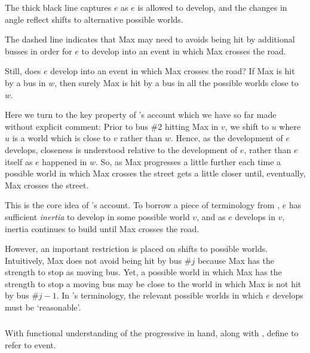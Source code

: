 \begin{note}
  The thick black line captures \(e\) as \(e\) is allowed to develop, and the changes in angle reflect shifts to alternative possible worlds.

  The dashed line indicates that Max may need to avoids being hit by additional busses in order for \(e\) to develop into an event in which Max crosses the road.

  Still, does \(e\) develop into an event in which Max crosses the road?
  If Max is hit by a bus in \(w\), then surely Max is hit by a bus in all the possible worlds close to \(w\).

  Here we turn to the key property of \citeauthor{Landman:1992wh}'s account which we have so far made without explicit comment:
  Prior to bus \#2 hitting Max in \(v\), we shift to \(u\) where \(u\) is a world which is close to \(v\) rather than \(w\).
  Hence, as the development of \(e\) develops, closeness is understood relative to the development of \(e\), rather than \(e\) itself as \(e\) happened in \(w\).
  So, as Max progresses a little further each time a possible world in which Max crosses the street gets a little closer until, eventually, Max crosses the street.

  This is the core idea of \citeauthor{Landman:1992wh}'s account.
  To borrow a piece of terminology from \textcite{Dowty:1979vq}, \(e\) has sufficient \emph{inertia} to develop in some possible world \(v\), and as \(e\) develops in \(v\), inertia continues to build until Max crosses the road.

  However, an important restriction is placed on shifts to possible worlds.
  Intuitively, Max does not avoid being hit by bus \#\(j\) because Max has the strength to stop as moving bus.
  Yet, a possible world in which Max has the strength to stop a moving bus may be close to the world in which Max is not hit by bus \#\(j - 1\).
  In \citeauthor{Landman:1992wh}'s terminology, the relevant possible worlds in which \(e\) develops must be `reasonable'.
\end{note}

\subparagraph{}
\label{cha:sec:fcs-def:potential-events}

\begin{note}
  With functional understanding of the progressive in hand, along with \assuPP{}, define \pevent{} to refer to event.
\end{note}


